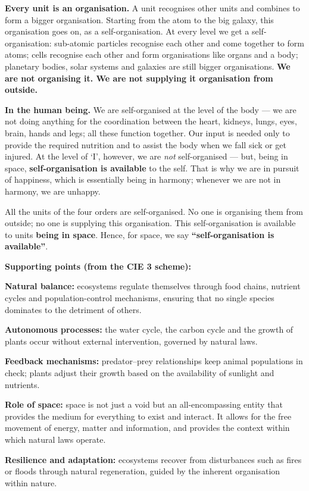 
\ans \textbf{Every unit is an organisation.} A unit recognises other units and
combines to form a bigger organisation. Starting from the atom to the big
galaxy, this organisation goes on, as a self-organisation. At every level we
get a self-organisation: sub-atomic particles recognise each other and come
together to form atoms; cells recognise each other and form organisations like
organs and a body; planetary bodies, solar systems and galaxies are still
bigger organisations. \textbf{We are not organising it. We are not supplying
it organisation from outside.}

\textbf{In the human being.} We are self-organised at the level of the body
--- we are not doing anything for the coordination between the heart, kidneys,
lungs, eyes, brain, hands and legs; all these function together. Our input is
needed only to provide the required nutrition and to assist the body when we
fall sick or get injured. At the level of `I', however, we are \emph{not}
self-organised --- but, being in space, \textbf{self-organisation is
available} to the self. That is why we are in pursuit of happiness, which is
essentially being in harmony; whenever we are not in harmony, we are unhappy.

All the units of the four orders are self-organised. No one is organising them
from outside; no one is supplying this organisation. This self-organisation is
available to units \textbf{being in space}. Hence, for space, we say
\textbf{``self-organisation is available''}.

\textbf{Supporting points (from the CIE 3 scheme):}

\begin{abul}
\item \textbf{Natural balance:} ecosystems regulate themselves through food
      chains, nutrient cycles and population-control mechanisms, ensuring that
      no single species dominates to the detriment of others.
\item \textbf{Autonomous processes:} the water cycle, the carbon cycle and the
      growth of plants occur without external intervention, governed by
      natural laws.
\item \textbf{Feedback mechanisms:} predator--prey relationships keep animal
      populations in check; plants adjust their growth based on the
      availability of sunlight and nutrients.
\item \textbf{Role of space:} space is not just a void but an all-encompassing
      entity that provides the medium for everything to exist and interact. It
      allows for the free movement of energy, matter and information, and
      provides the context within which natural laws operate.
\item \textbf{Resilience and adaptation:} ecosystems recover from disturbances
      such as fires or floods through natural regeneration, guided by the
      inherent organisation within nature.
\end{abul}


